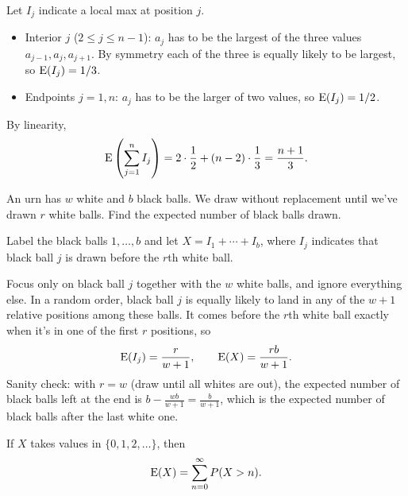 \medskip

\begin{solution}
Let $I_j$ indicate a local max at position $j$.
\medskip
\begin{itemize}
  \setlength{\itemsep}{0.4em}
  \item Interior $j$ ($2 \le j \le n - 1$): $a_j$ has to be the largest of the three values $a_{j-1}, a_j, a_{j+1}$. By symmetry each of the three is equally likely to be largest, so $\operatorname{E}(I_j) = 1/3$.
  \item Endpoints $j = 1, n$: $a_j$ has to be the larger of two values, so $\operatorname{E}(I_j) = 1/2$.
\end{itemize}
\medskip
By linearity,
\medskip
\[
\operatorname{E}\left(\sum_{j=1}^{n} I_j\right) = 2 \cdot \frac{1}{2} + (n - 2) \cdot \frac{1}{3} = \frac{n + 1}{3}.
\]
\end{solution}

\bigskip

\begin{example}\label{ex:nhgeom}
An urn has $w$ white and $b$ black balls. We draw without replacement until we've drawn $r$ white balls. Find the expected number of black balls drawn.
\end{example}

\medskip

\begin{solution}
Label the black balls $1, \dots, b$ and let $X = I_1 + \cdots + I_b$, where $I_j$ indicates that black ball $j$ is drawn before the $r$th white ball.

\medskip

Focus only on black ball $j$ together with the $w$ white balls, and ignore everything else. In a random order, black ball $j$ is equally likely to land in any of the $w + 1$ relative positions among these balls. It comes before the $r$th white ball exactly when it's in one of the first $r$ positions, so
\medskip
\[
\operatorname{E}(I_j) = \frac{r}{w + 1},
\qquad
\operatorname{E}(X) = \frac{rb}{w + 1}.
\]
\medskip
Sanity check: with $r = w$ (draw until all whites are out), the expected number of black balls left at the end is $b - \frac{wb}{w+1} = \frac{b}{w+1}$, which is the expected number of black balls after the last white one.
\end{solution}

\bigskip

\begin{theorem}\label{thm:survival}
If $X$ takes values in $\{0, 1, 2, \dots\}$, then
\medskip
\[
\operatorname{E}(X) = \sum_{n=0}^{\infty} P(X > n).
\]
\end{theorem}

